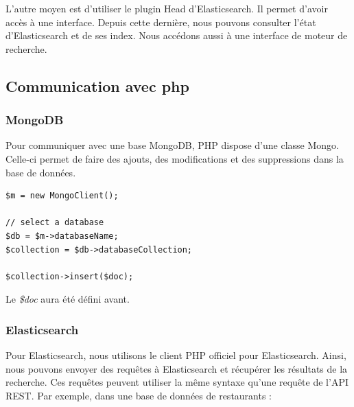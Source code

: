 L’autre moyen est d’utiliser le plugin Head d’Elasticsearch. Il permet d’avoir accès à une interface. Depuis cette dernière, nous pouvons consulter l’état d’Elasticsearch et de ses index. Nous accédons aussi à une interface de moteur de recherche.

\subsection{Communication avec php}
\subsubsection{MongoDB}

Pour communiquer avec une base MongoDB, PHP dispose d’une classe Mongo. Celle-ci permet de faire des ajouts, des modifications et des suppressions dans la base de données. 

\begin{verbatim}
$m = new MongoClient();

// select a database
$db = $m->databaseName;   
$collection = $db->databaseCollection;

$collection->insert($doc);
\end{verbatim}

Le \textit{\$doc} aura été défini avant.

\subsubsection{Elasticsearch}

Pour Elasticsearch, nous utilisons le client PHP officiel pour Elasticsearch. Ainsi, nous pouvons envoyer des requêtes à Elasticsearch et récupérer les résultats de la recherche. Ces requêtes peuvent utiliser la même syntaxe qu’une requête de l’API REST. Par exemple, dans une base de données de restaurants :




